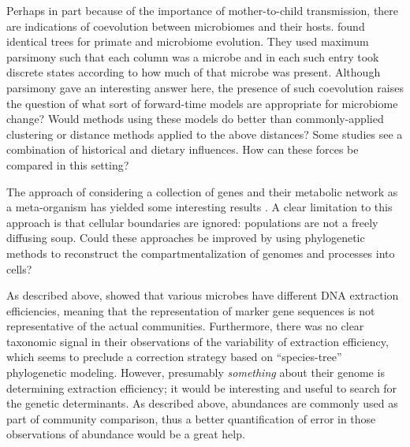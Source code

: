 \documentclass{amsart}
\begin{document}
Perhaps in part because of the importance of mother-to-child transmission, there are indications of coevolution between microbiomes and their hosts.
\citet{ochman2010evolutionary} found identical trees for primate and microbiome evolution.
They used maximum parsimony such that each column was a microbe and in each such entry took discrete states according to how much of that microbe was present.
Although parsimony gave an interesting answer here, the presence of such coevolution raises the question of what sort of forward-time models are appropriate for microbiome change?
Would methods using these models do better than commonly-applied clustering or distance methods applied to the above distances?
Some studies \citep[e.g.][]{phillips2012microbiome,delsuc2013convergence} see a combination of historical and dietary influences.
How can these forces be compared in this setting?

The approach of considering a collection of genes and their metabolic network as a meta-organism has yielded some interesting results \citep{borenstein2008large,greenblum2012metagenomic}.
A clear limitation to this approach is that cellular boundaries are ignored: populations are not a freely diffusing soup.
Could these approaches be improved by using phylogenetic methods to reconstruct the compartmentalization of genomes and processes into cells?

As described above, \citet{morgan2010metagenomic} showed that various microbes have different DNA extraction efficiencies, meaning that the representation of marker gene sequences is not representative of the actual communities.
Furthermore, there was no clear taxonomic signal in their observations of the variability of extraction efficiency, which seems to preclude a correction strategy based on ``species-tree'' phylogenetic modeling.
However, presumably \textit{something} about their genome is determining extraction efficiency; it would be interesting and useful to search for the genetic determinants.
As described above, abundances are commonly used as part of community comparison, thus a better quantification of error in those observations of abundance would be a great help.
\end{document}
